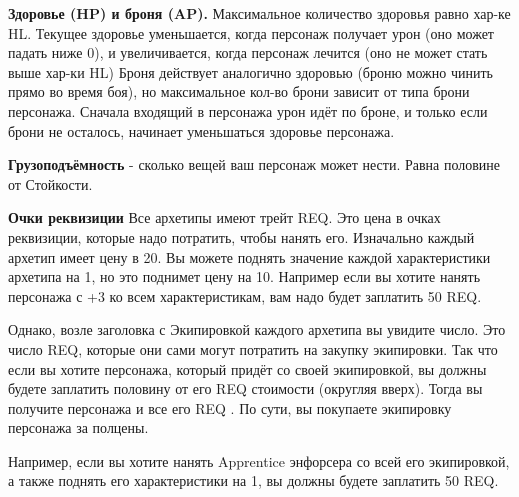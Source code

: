 \begin{multicols}{2}
\textbf{Здоровье (HP) и броня (AP).}
Максимальное количество здоровья равно хар-ке HL. Текущее здоровье уменьшается, когда персонаж получает 
урон (оно может падать ниже 0), и увеличивается, когда персонаж лечится (оно не может стать выше хар-ки HL) 
Броня действует аналогично здоровью (броню можно чинить прямо во время боя), но максимальное кол-во брони 
зависит от типа брони персонажа. Сначала входящий в персонажа урон идёт по броне, и только если брони не осталось, 
начинает уменьшаться здоровье персонажа.

\textbf{Грузоподъёмность}
- сколько вещей ваш персонаж может нести. Равна половине от Стойкости.

\textbf{Очки реквизиции}
Все архетипы имеют трейт REQ. Это цена в очках реквизиции, которые надо потратить, чтобы нанять его.
 Изначально каждый архетип имеет цену в 20. Вы можете поднять значение каждой характеристики архетипа 
 на 1, но это поднимет цену на 10. Например если вы хотите нанять персонажа с +3 ко всем характеристикам,
  вам надо будет заплатить 50 REQ.

Однако, возле заголовка с Экипировкой каждого архетипа вы увидите число. Это число REQ, которые они 
сами могут потратить на закупку экипировки. Так что если вы хотите персонажа, который придёт со своей
 экипировкой, вы должны будете заплатить половину от его REQ стоимости (округляя вверх). Тогда вы 
 получите персонажа и все его REQ . По сути, вы покупаете экипировку персонажа за полцены.

Например, если вы хотите нанять Apprentice энфорсера со всей его экипировкой, а также поднять его 
характеристики на 1, вы должны будете заплатить 50 REQ.

\end{multicols}